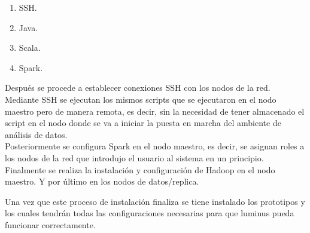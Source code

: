 \begin{enumerate}
	\item SSH. \\
	\item Java.\\
	\item Scala.\\
	\item Spark.\\
\end{enumerate}

Después se procede a establecer conexiones SSH con los nodos de la red. Mediante SSH se ejecutan los mismos scripts que se ejecutaron en el nodo maestro pero de manera remota, es decir, sin la necesidad de tener almacenado el script en el nodo donde se va a iniciar la puesta en marcha del ambiente de análisis de datos.\\

Posteriormente se configura Spark en el nodo maestro, es decir, se asignan roles a los nodos de la red que introdujo el usuario al sistema en un principio.\\

Finalmente se realiza la instalación y configuración de Hadoop en el nodo maestro. Y por último en los nodos de datos/replica.

Una vez que este proceso de instalación finaliza se tiene instalado los prototipos  y  los cuales tendrán todas las configuraciones necesarias para que luminus pueda funcionar correctamente.

